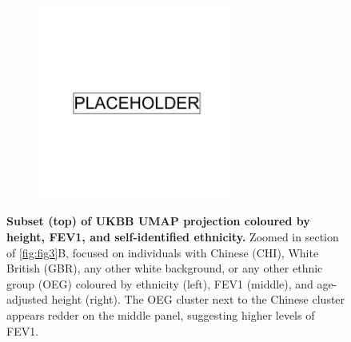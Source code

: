 \begin{figure}[ht]
    \centering
    \begin{subfigure}{\textwidth}
    \includegraphics[width=0.7\textwidth]{placeholder.png}
    \end{subfigure}
    \caption[Subset (top) of UKBB UMAP projection coloured by height, FEV1, and self-identified ethnicity]{\textbf{Subset (top) of UKBB UMAP projection coloured by height, FEV1, and self-identified ethnicity.} Zoomed in section of \ref{fig:fig3}B, focused on individuals with Chinese (CHI), White British (GBR), any other white background, or any other ethnic group (OEG) coloured by ethnicity (left), FEV1 (middle), and age-adjusted height (right). The OEG cluster next to the Chinese cluster appears redder on the middle panel, suggesting higher levels of FEV1.}
    \label{fig:supp_comparison_fev_chi_eur}
\end{figure}

\newpage

